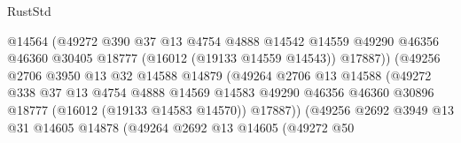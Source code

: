 \begin{lexlean}{RustStd}
\begin{coremodule}
                                      @14564
                                      (@49272
                                        @390
                                        @37
                                        @13
                                        @4754
                                        @4888
                                        @14542
                                        @14559
                                        @49290
                                        @46356
                                        @46360
                                        @30405
                                        @18777
                                        (@16012 (@19133 @14559 @14543))
                                        @17887))
                                    (@49256
                                      @2706
                                      @3950
                                      @13
                                      @32
                                      @14588
                                      @14879
                                      (@49264
                                        @2706
                                        @13
                                        @14588
                                        (@49272
                                          @338
                                          @37
                                          @13
                                          @4754
                                          @4888
                                          @14569
                                          @14583
                                          @49290
                                          @46356
                                          @46360
                                          @30896
                                          @18777
                                          (@16012 (@19133 @14583 @14570))
                                          @17887))
                                      (@49256
                                        @2692
                                        @3949
                                        @13
                                        @31
                                        @14605
                                        @14878
                                        (@49264
                                          @2692
                                          @13
                                          @14605
                                          (@49272
                                            @50

\end{coremodule}
\end{lexlean}
